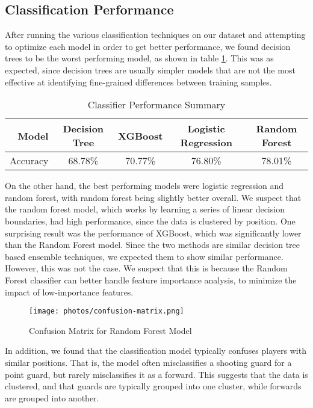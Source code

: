 \documentclass[./main.tex]{subfiles}
\begin{document}
\subsection{Classification Performance}
After running the various classification techniques on our dataset and attempting to optimize each model in order to get better performance, we found decision trees to be the worst performing model, as shown in table \ref{tab:summary-stats}. This was as expected, since decision trees are usually simpler models that are not the most effective at identifying fine-grained differences between training samples.

\begin{table}[H]
\begin{tabular}{rcccc}\toprule
    Model & Decision Tree & XGBoost & Logistic Regression & Random Forest \\ \midrule
    Accuracy & 68.78\% & 70.77\% & 76.80\% & 78.01\% \\
\bottomrule\end{tabular}
\caption{Classifier Performance Summary}\label{tab:summary-stats}
\end{table}
On the other hand, the best performing models were logistic regression and random forest, with random forest being slightly better overall. We suspect that the random forest model, which works by learning a series of linear decision boundaries, had high performance, since the data is clustered by position. One surprising result was the performance of XGBoost, which was significantly lower than the Random Forest model. Since the two methods are similar decision tree based ensemble techniques, we expected them to show similar performance. However, this was not the case. We suspect that this is because the Random Forest classifier can better handle feature importance analysis, to minimize the impact of low-importance features.

\begin{wrapfigure}{l}{5.5cm}
    \centering
    \texttt{[image: photos/confusion-matrix.png]}
    \caption{Confusion Matrix for Random Forest Model}
    \label{fig:conf-matrix}
\end{wrapfigure}
In addition, we found that the classification model typically confuses players with similar positions. That is, the model often misclassifies a shooting guard for a point guard, but rarely misclassifies it as a forward. This suggests that the data is clustered, and that guards are typically grouped into one cluster, while forwards are grouped into another.
\end{document}
